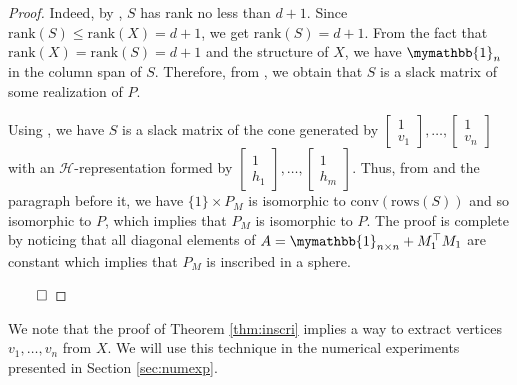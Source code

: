 \documentclass[smallextended, envcountsame]{svjour3}
\begin{document}
\begin{proof}
        Indeed, by \cite[Lemma 3.1]{gouveia2019slack}, $S$ has rank no less than $d+1$.  Since $\mathrm{rank}(S)\le\mathrm{rank}(X)=d+1$, we get $\mathrm{rank}(S)=d+1$.  From the fact that $\mathrm{rank}(X)=\mathrm{rank}(S)=d+1$ and the structure of $X$, we have $\mymathbb{1}_n$ in the column span of $S$.  Therefore, from \cite[Theorem 2.2]{gouveia2019slack}, we obtain that $S$ is a slack matrix of some realization of $P$. 

        Using \cite[Lemma 5 and Theorem 6]{gouveia2013nonnegative}, we have $S$ is a slack matrix of the cone generated by $\begin{bmatrix}
            1\\
            v_1
        \end{bmatrix},\ldots,\begin{bmatrix}
            1\\
            v_n
        \end{bmatrix}$ with an $\mathcal{H}$-representation formed by $\begin{bmatrix}
            1\\
            h_1
        \end{bmatrix},\ldots,\begin{bmatrix}
            1\\
            h_m
        \end{bmatrix}$.  Thus, from \cite[Theorem~14]{gouveia2013nonnegative} and the paragraph before it, we have $\{1\}\times P_M$ is isomorphic to $\mathrm{conv}(\mathrm{rows}(S))$ and so isomorphic to $P$, which implies that $P_M$ is isomorphic to $P$.  The proof is complete by noticing that all diagonal elements of $A= \mymathbb{1}_{n\times n}+M_1^\top M_1$ are constant which implies that $P_M$ is inscribed in a sphere.

    $\hfill\qed$
    \end{proof}

    We note that the proof of Theorem \ref{thm:inscri} implies a way to extract vertices $v_1,\ldots,v_n$ from $X$.  We will use this technique in the numerical experiments presented in Section \ref{sec:numexp}.
\end{document}
